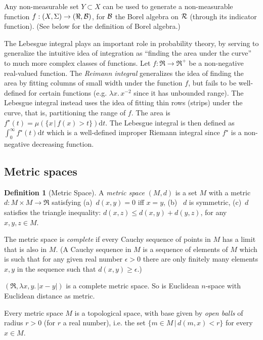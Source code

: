 \documentclass{article}
\newcommand{\alt}{\,|\,}
\theoremstyle{definition}
\newtheorem{definition}{Definition}[section]
\begin{document}
Any non-measurable set \(Y \subset X\) can be used to generate a non-measurable function \(f:(X,\Sigma)\rightarrow (\Re, {\cal B})\), for \({\cal B}\) the Borel algebra on \(\cal R\) (through its indicator function). (See below for the definition of Borel algebra.)

The Lebesgue integral plays an important role in probability theory, by serving to generalize the intuitive idea of integration as ``finding the area under the curve'' to much more complex classes of functions. Let \(f:\Re \rightarrow \Re^+\) be a non-negative real-valued function. The {\em Reimann integral} generalizes the idea of finding the area by fitting columns of small width under the function \(f\), but fails to be well-defined for certain functions (e.g. \(\lambda x.\, x^{-2}\) since it has unbounded range). The Lebesgue integral instead uses the idea of fitting thin rows (strips) under the curve, that is, partitioning the range of \(f\). The area is \(f^{\star}(t)=\mu(\{x \alt f(x) > t\}) {\mathrm dt}\).  The Lebesgue integral is then defined as \(\int_0^{\infty} f^{\star}(t){\mathrm dt}\) which is a well-defined improper Riemann integral since \(f^{\star}\) is a non-negative decreasing function. 

\subsection{Metric spaces}

\begin{definition}[Metric Space] A {\em metric space} \((M,d)\) is a set \(M\) with a metric \(d:M \times M \rightarrow \Re\) satisfying (a)~\(d(x,y)=0\) iff \(x=y\), (b)~ \(d\) is symmetric, (c)~\(d\) satisfies the triangle inequality: \(d(x,z) \leq d(x,y)+d(y,z)\), for any \(x,y,z\in M\).

  The metric space is {\em complete} if every Cauchy sequence of points in \(M\) has a limit that is also in \(M\). (A Cauchy sequence in \(M\) is a sequence of elements of \(M\) which is such that for any given real number \(\epsilon > 0\) there are only finitely many elements \(x,y\) in the sequence such that \(d(x,y) \geq \epsilon\).)
\end{definition}

\((\Re, \lambda x,y.\, |x-y|)\) is a complete metric space. So is Euclidean \(n\)-space with Euclidean distance as metric.

Every metric space \(M\) is a topological space, with base given by {\em open balls} of radius \(r > 0\) (for \(r\) a real number), i.e. the set \(\{m \in M \alt d(m,x) < r\}\) for every \(x\in M\).
\end{document}
